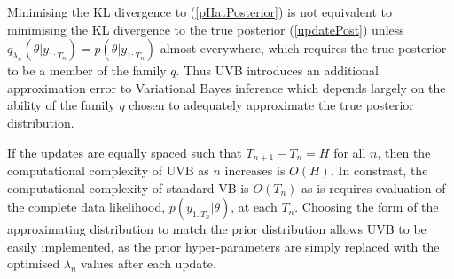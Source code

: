 \documentclass[12pt,a4paper]{article}\usepackage[]{graphicx}\usepackage[]{color}
\begin{document}
\iffalse
The ELBO gradient estimators to construct the updated Variational Bayes approximation $q_{\lambda_{n}}(\theta | y_{1:T_{n}})$, can be obtained by substituting 
\begin{equation}
\label{ApproxJoint}
\hat{p}(\theta |  y_{1:T_{n}}) = p(y_{T_{n-1}+1:T_{n}} | \theta)q_{\lambda_{n-1}}(\theta | y_{1:T_{n-1}}).
\end{equation}
into the score gradient estimator (\ref{scoreDeriv}) or the reparameterised gradient estimator (\ref{rpDeriv}). The updating score estimator is given by
\begin{align}
\widehat{\frac{\partial\mathcal{L}(q, \lambda_{n})}{\partial \lambda_{n}}}_{USC} &= \sum_{j = 1}^M \frac{\partial \log(q_{\lambda_{n}}(\theta_{j} | y_{1:T_{n}}))}{\partial \lambda_{n}} \nonumber \\
&\times \left(\log(q_{\lambda_{n-1}}(\theta_{j} | y_{1:T_{n-1}})p(y_{T_{n-1}+1:T_{n}} | y_{1:T_{n-1}}, \theta)) - \log(q_{\lambda_{n}}(\theta_{j} | y_{1:T_{n}})) \right) \label{scoreUpdate}
\end{align}
where $\theta_{j} \sim q_{\lambda_{n}}(\theta | y_{1:T_{n}})$. Similarly, the updating reparameterised estimator is given by
\begin{align}
\widehat{\frac{\partial\mathcal{L}(q, \lambda_{n})}{\partial \lambda_{n}}}_{URP} &= \sum_{j = 1}^M \frac{\partial f(\lambda_{n}, \epsilon_j)}{\partial \lambda_{n}} \frac{\partial \log(q_{\lambda_{n-1}}(\theta |y_{1:T_{n-1}})p(y_{T_{n-1}+1:T_{n}} | y_{1:T_{n-1}}, \theta))}{\partial \theta} \bigg\rvert_{\theta = f(\lambda_{n}, \epsilon_j)} \nonumber \\
& + \frac{\partial \log(J(\lambda_{n}, \epsilon_j))}{\partial \lambda_{n}}, \label{rpUpdate}
\end{align}
where $\epsilon_j \sim r(\epsilon)$. 
\fi

Minimising the KL divergence to (\ref{pHatPosterior}) is not equivalent to minimising the KL divergence to the true posterior (\ref{updatePost}) unless $q_{\lambda_{n}}(\theta |  y_{1:T_{n}}) = p(\theta |  y_{1:T_{n}})$ almost everywhere, which requires the true posterior to be a member of the family $q$. Thus UVB introduces an additional approximation error to Variational Bayes inference which depends largely on the ability of the family $q$ chosen to adequately approximate the true posterior distribution.

If the updates are equally spaced such that $T_{n+1} - T_{n} = H$ for all $n$, then the computational complexity of UVB as $n$ increases is $O(H)$. In constrast, the computational complexity of standard VB is $O(T_{n})$ as is requires evaluation of the complete data likelihood, $p(y_{1:T_{n}} | \theta)$, at each $T_{n}$. Choosing the form of the approximating distribution to match the prior distribution allows UVB to be easily implemented, as the prior hyper-parameters are simply replaced with the optimised $\lambda_n$ values after each update.
\end{document}
